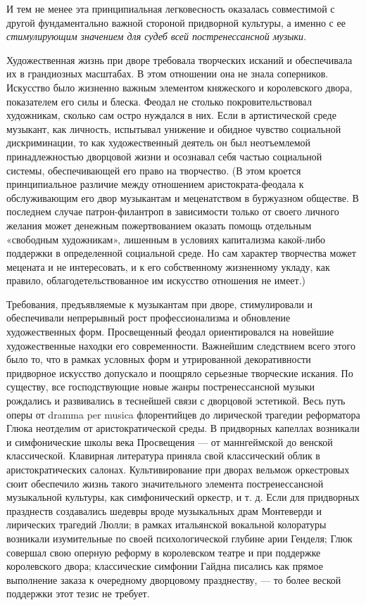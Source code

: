 И тем не менее  эта принципиальная легковесность оказалась совместимой
с другой фундаментально важной  стороной придворной культуры, а именно
с  ее \emph{стимулирующим  значением для  судеб всей  постренессансной
музыки}.

Художественная  жизнь   при  дворе  требовала  творческих   исканий  и
обеспечивала их в грандиозных масштабах. В этом отношении она не знала
соперников.  Искусство было  жизненно  важным  элементом княжеского  и
королевского двора, показателем  его силы и блеска.  Феодал не столько
покровительствовал художникам, сколько сам  остро нуждался в них. Если
в  артистической  среде  музыкант, как  личность,  испытывал  унижение
и  обидное чувство  социальной  дискриминации,  то как  художественный
деятель  он   был  неотъемлемой  принадлежностью  дворцовой   жизни  и
осознавал себя частью социальной  системы, обеспечивающей его право на
творчество. (В  этом кроется принципиальное различие  между отношением
аристократа-феодала к обслуживающим его двор музыкантам и меценатством
в  буржуазном   обществе.  В   последнем  случае   патрон-филантроп  в
зависимости   только  от   своего  личного   желания  может   денежным
пожертвованием  оказать   помощь  отдельным   «свободным  художникам»,
лишенным в  условиях капитализма  какой-либо поддержки  в определенной
социальной  среде. Но  сам  характер творчества  может  мецената и  не
интересовать,  и к  его собственному  жизненному укладу,  как правило,
облагодетельствованное им искусство отношения не имеет.)

Требования,  предъявляемые  к   музыкантам  при  дворе,  стимулировали
и   обеспечивали  непрерывный   рост  профессионализма   и  обновление
художественных  форм. Просвещенный  феодал ориентировался  на новейшие
художественные   находки  его   современности.  Важнейшим   следствием
всего  этого  было то,  что  в  рамках  условных форм  и  утрированной
декоративности  придворное искусство  допускало  и поощряло  серьезные
творческие  искания.  По  существу,  все  господствующие  новые  жанры
постренессансной  музыки рождались  и  развивались  в теснейшей  связи
с  дворцовой  эстетикой.   Весь  путь  оперы  от   dramma  per  musica
флорентийцев  до  лирической   трагедии  реформатора  Глюка  неотделим
от  аристократической   среды.  В  придворных  капеллах   возникали  и
симфонические школы  века Просвещения  --- от маннгеймской  до венской
классической.  Клавирная литература  приняла  свой классический  облик
в  аристократических  салонах.   Культивирование  при  дворах  вельмож
оркестровых  сюит  обеспечило   жизнь  такого  значительного  элемента
постренессансной  музыкальной культуры,  как симфонический  оркестр, и
т.  д.  Если  для  придворных  празднеств  создавались  шедевры  вроде
музыкальных  драм Монтеверди  и  лирических трагедий  Люлли; в  рамках
итальянской  вокальной  колоратуры  возникали  изумительные  по  своей
психологической  глубине  арии  Генделя; Глюк  совершал  свою  оперную
реформу  в  королевском театре  и  при  поддержке королевского  двора;
классические симфонии  Гайдна писались как прямое  выполнение заказа к
очередному дворцовому празднеству, ---  то более веской поддержки этот
тезис не требует.

